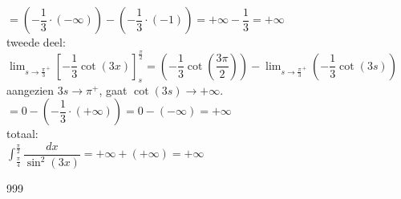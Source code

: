 \documentclass[a4paper]{article}
\begin{document}
$\displaystyle = \left( -\dfrac{1}{3} \cdot (-\infty) \right) - \left( -\dfrac{1}{3} \cdot (-1) \right) = +\infty - \dfrac{1}{3} = +\infty$ \\

tweede deel: \\

$\displaystyle \lim_{s \to \tfrac{\pi}{3}^{+}} \left[ -\dfrac{1}{3} \cot(3x) \right]_{s}^{\tfrac{\pi}{2}} = \left( -\dfrac{1}{3} \cot\left(\dfrac{3\pi}{2}\right) \right) - \lim_{s \to \tfrac{\pi}{3}^{+}} \left( -\dfrac{1}{3} \cot(3s) \right)$ \\

aangezien $3s \to \pi^{+}$, gaat $\cot(3s) \to +\infty$. \\

$\displaystyle = 0 - \left( -\dfrac{1}{3} \cdot (+\infty) \right) = 0 - (-\infty) = +\infty$ \\

totaal: \\

$\displaystyle \int_{\tfrac{\pi}{4}}^{\tfrac{\pi}{2}} \dfrac{dx}{\sin^{2}(3x)} = +\infty + (+\infty) = +\infty$ \\

\begin{thebibliography}{999}
\end{thebibliography}
\end{document}
